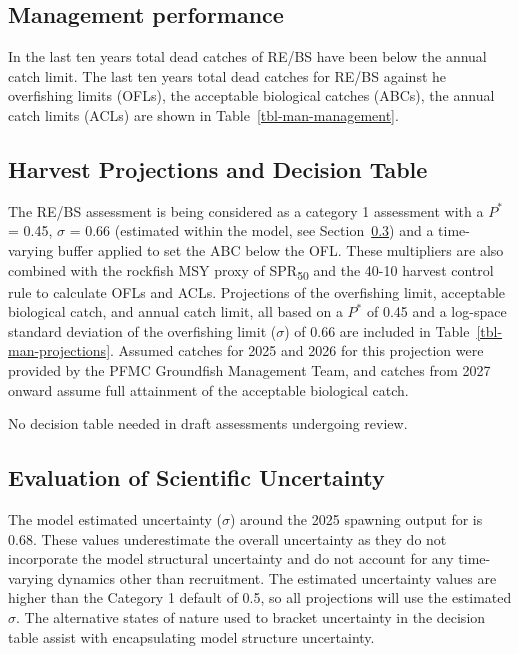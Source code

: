 \documentclass[
]{scrartcl}
\begin{document}
\subsection{Management performance}\label{management-performance-1}

In the last ten years total dead catches of RE/BS have been below the
annual catch limit. The last ten years total dead catches for RE/BS
against he overfishing limits (OFLs), the acceptable biological catches
(ABCs), the annual catch limits (ACLs) are shown in
Table~\ref{tbl-man-management}.

\subsection{Harvest Projections and Decision
Table}\label{harvest-projections-and-decision-table}

The RE/BS assessment is being considered as a category 1 assessment with
a \(P^*\) = 0.45, \(\sigma\) = 0.66 (estimated within the model, see
Section~\ref{sec-uncertainty}) and a time-varying buffer applied to set
the ABC below the OFL. These multipliers are also combined with the
rockfish MSY proxy of SPR\textsubscript{50} and the 40-10 harvest
control rule to calculate OFLs and ACLs. Projections of the overfishing
limit, acceptable biological catch, and annual catch limit, all based on
a \(P^*\) of 0.45 and a log-space standard deviation of the overfishing
limit (\(\sigma\)) of 0.66 are included in
Table~\ref{tbl-man-projections}. Assumed catches for 2025 and 2026 for
this projection were provided by the PFMC Groundfish Management Team,
and catches from 2027 onward assume full attainment of the acceptable
biological catch.

No decision table needed in draft assessments undergoing review.

\subsection{Evaluation of Scientific Uncertainty}\label{sec-uncertainty}

The model estimated uncertainty (\(\sigma\)) around the 2025 spawning
output for is 0.68. These values underestimate the overall uncertainty
as they do not incorporate the model structural uncertainty and do not
account for any time-varying dynamics other than recruitment. The
estimated uncertainty values are higher than the Category 1 default of
0.5, so all projections will use the estimated \(\sigma\). The
alternative states of nature used to bracket uncertainty in the decision
table assist with encapsulating model structure uncertainty.
\end{document}
